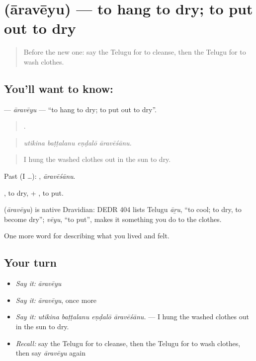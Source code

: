 \section[\texorpdfstring{\te{ఆరవేయు} (āravēyu)}{ఆరవేయు (āravēyu)}]{ (āravēyu) — to hang to dry; to put out to dry}

\label{lesson:TE-C547-araveyu}



\begin{quote}
Before the new one: say the Telugu for to cleanse, then the Telugu for to wash clothes.
\end{quote}

\subsection*{You'll want to know: }
\textbf{} — \emph{āravēyu} — \textquotedblleft{}to hang to dry; to put out to dry\textquotedblright{}.

\begin{quote}
   .
\end{quote}

\begin{quote}
\emph{utikina baṭṭalanu eṇḍalō āravēśānu.}
\end{quote}

\begin{quote}
I hung the washed clothes out in the sun to dry.
\end{quote}

Past (I …): , \emph{āravēśānu}.

, to dry, + , to put.

\begin{cousinweb}
\textbf{} (\emph{āravēyu}) is native Dravidian: DEDR 404 lists Telugu \emph{āṟu}, \textquotedblleft{}to cool; to dry, to become dry\textquotedblright{}; \emph{vēyu}, \textquotedblleft{}to put\textquotedblright{}, makes it something you do to the clothes.
\end{cousinweb}

\begin{grammarlens}[title={What you've built}]
One more word for describing what you lived and felt.
\end{grammarlens}

\subsection*{Your turn}
\begin{itemize}
\raggedright
  \item \emph{Say it:} \emph{āravēyu}
  \item \emph{Say it:} \emph{āravēyu}, once more
  \item \emph{Say it:} \emph{utikina baṭṭalanu eṇḍalō āravēśānu.} — I hung the washed clothes out in the sun to dry.
  \item \emph{Recall:} say the Telugu for to cleanse, then the Telugu for to wash clothes, then say \emph{āravēyu} again
\end{itemize}


